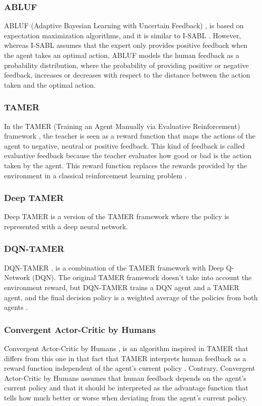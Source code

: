 \subsubsection*{ABLUF}
ABLUF (Adaptive Bayesian Learning with Uncertain Feedback) \cite{ABLUF-he:2020}, is based on expectation maximization algorithms, and it is similar to I-SABL \cite{I-SABL-Loftin:2016}. However, whereas I-SABL assumes that the expert only provides positive feedback when the agent takes an optimal action, ABLUF models the human feedback as a probability distribution, where the probability of providing positive or negative feedback, increases or decreases with respect to the distance between the action taken and the optimal action.



\subsubsection*{TAMER}
In the TAMER (Training an Agent Manually via Evaluative Reinforcement) framework \cite{TAMER-Knox-Stone:2009}, the teacher is seen as a reward function that maps the actions of the agent to negative, neutral or positive feedback. This kind of feedback is called evaluative feedback because the teacher evaluates how good or bad is the action taken by the agent. This reward function replaces the rewards provided by the environment in a classical reinforcement learning problem \cite{leveraging-human-guidance:2019}.
 

\subsubsection*{Deep TAMER}
Deep TAMER \cite{DeepTAMER-Warnell-et-al:2018} is a version of the TAMER framework \cite{TAMER-Knox-Stone:2009} where the policy is represented with a deep neural network.

\subsubsection*{DQN-TAMER}
DQN-TAMER \cite{DQN-TAMER-Arakawa:2018}, is a combination of the TAMER framework \cite{TAMER-Knox-Stone:2009} with Deep Q-Network (DQN). The original TAMER framework doesn't take into account the environment reward, but DQN-TAMER trains a DQN agent and a TAMER agent, and the final decision policy is a weighted average of the policies from both agents \cite{leveraging-human-guidance:2019}.

\subsubsection*{Convergent Actor-Critic by Humans}
Convergent Actor-Critic by Humans \cite{fakeCOACH-MacGlashan-Ho-Loftin:2017}, is an algorithm inspired in TAMER \cite{TAMER-Knox-Stone:2009} that differs from this one in that fact that TAMER interprets human feedback as a reward function independent of the agent’s current policy \cite{leveraging-human-guidance:2019}. 
Contrary, Convergent Actor-Critic by Humans assumes that human feedback depends on the agent's current policy and that it should be interpreted as the advantage function that tells how much better or worse when deviating from the agent’s current policy.

